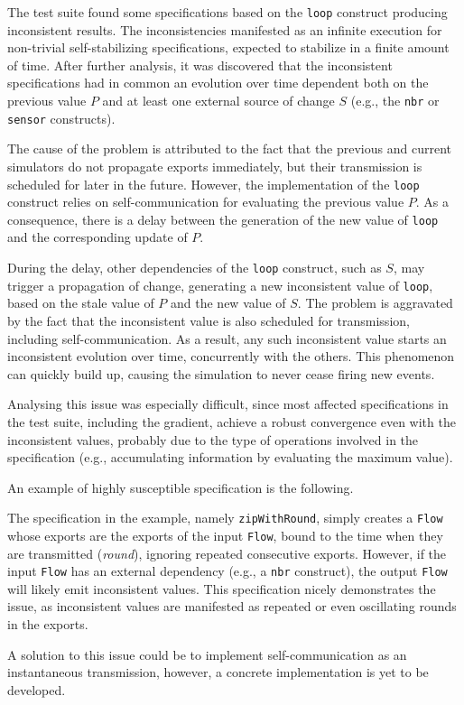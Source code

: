 The test suite found some specifications based on the \texttt{loop} construct
producing inconsistent results. The inconsistencies manifested as an infinite
execution for non-trivial self-stabilizing specifications, expected to
stabilize in a finite amount of time. After further analysis, it was discovered
that the inconsistent specifications had in common an evolution over time
dependent both on the previous value $P$ and at least one external source of
change $S$ (e.g., the \texttt{nbr} or \texttt{sensor} constructs).

The cause of the problem is attributed to the fact that the previous and
current simulators do not propagate exports immediately, but their transmission
is scheduled for later in the future. However, the implementation of the
\texttt{loop} construct relies on self-communication for evaluating the
previous value $P$. As a consequence, there is a delay between the generation
of the new value of \texttt{loop} and the corresponding update of $P$.

During the delay, other dependencies of the \texttt{loop} construct, such as
$S$, may trigger a propagation of change, generating a new inconsistent value
of \texttt{loop}, based on the stale value of $P$ and the new value of $S$. The
problem is aggravated by the fact that the inconsistent value is also scheduled
for transmission, including self-communication. As a result, any such
inconsistent value starts an inconsistent evolution over time, concurrently
with the others. This phenomenon can quickly build up, causing the simulation
to never cease firing new events.

Analysing this issue was especially difficult, since most affected
specifications in the test suite, including the gradient, achieve a robust
convergence even with the inconsistent values, probably due to the type of
operations involved in the specification (e.g., accumulating information by
evaluating the maximum value).

An example of highly susceptible specification is the following.



The specification in the example, namely \texttt{zipWithRound}, simply creates
a \texttt{Flow} whose exports are the exports of the input \texttt{Flow}, bound
to the time when they are transmitted (\textit{round}), ignoring repeated
consecutive exports. However, if the input \texttt{Flow} has an external
dependency (e.g., a \texttt{nbr} construct), the output \texttt{Flow} will
likely emit inconsistent values. This specification nicely demonstrates the
issue, as inconsistent values are manifested as repeated or even oscillating
rounds in the exports.

A solution to this issue could be to implement self-communication as an
instantaneous transmission, however, a concrete implementation is yet to be
developed.
